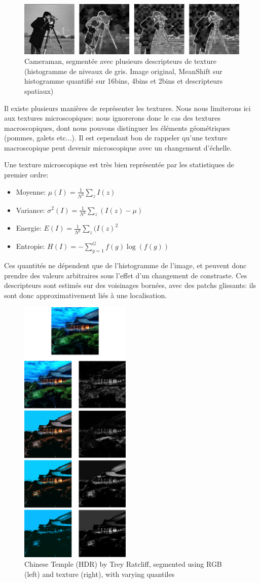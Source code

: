 \documentclass{article}
\begin{document}
\begin{figure}
\includegraphics[width=500px]{images/cameraman.png}
\caption{Cameraman, segmentée avec plusieurs descripteurs de texture
(histogramme de niveaux de gris. Image original, MeanShift sur histogramme 
quantifié sur 16bins, 4bins et 2bins et descripteurs spatiaux)}
\end{figure}

Il existe plusieurs manières de représenter les textures. Nous nous limiterons
ici aux textures microscopiques: nous ignorerons donc le cas des textures
macroscopiques, dont nous pouvons distinguer les éléments géométriques
(pommes, galets etc...). Il est cependant bon de rappeler qu'une texture
macroscopique peut devenir microscopique avec un changement d'échelle.

Une texture microscopique est très bien représentée par les statistiques de
premier ordre:
\begin{itemize}
\item Moyenne: $\mu(I) = \frac{1}{N^2} \sum_z I(z)$
\item Variance: $\sigma^2(I) = \frac{1}{N^2} \sum_z (I(z) - \mu)$
\item Energie: $E(I) = \frac{1}{N^2} \sum_z (I(z)^2$
\item Entropie: $H(I) = - \sum_{g = 1}^G f(g) \log(f(g))$
\end{itemize}

Ces quantités ne dépendent que de l'histogramme de l'image, et peuvent donc
prendre des valeurs arbitraires sous l'effet d'un changement de constraste.
Ces descripteurs  sont estimés sur des voisinages bornées, avec des patchs
glissants: ils sont donc approximativement liés à une localisation.

\begin{figure}
\includegraphics[width=200px]{images/all_chinese_temple.png}
\caption{Chinese Temple (HDR) by Trey Ratcliff, segmented using RGB (left) and
texture (right), with varying quantiles}
\end{figure}


\end{document}
